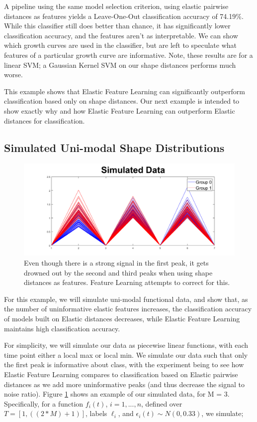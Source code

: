 \documentclass[]{article}
\begin{document}
A pipeline using the same model selection criterion, using elastic pairwise distances as features yields a Leave-One-Out classification accuracy of 74.19\%. While this classifier still does better than chance, it has significantly lower classification accuracy, and the features aren't as interpretable. We can show which growth curves are used in the classifier, but are left to speculate what features of a particular growth curve are informative. Note, these results are for a linear SVM; a Gaussian Kernel SVM on our shape distances performs much worse. 

This example shows that Elastic Feature Learning can significantly outperform classification based only on shape distances. Our next example is intended to show exactly why and how Elastic Feature Learning can outperform Elastic distances for classification.  


\subsection{Simulated Uni-modal Shape Distributions}

\begin{figure}
	\includegraphics[width = \linewidth]{./simulated data2.png}
	\caption{Even though there is a strong signal in the first peak, it gets drowned out by the second and third peaks when using shape distances as features. Feature Learning attempts to correct for this. }
	\label{simulated data}
\end{figure}

For this example, we will simulate uni-modal functional data, and show that, as the number of uninformative elastic features increases, the classification accuracy of models built on Elastic distances decreases, while Elastic Feature Learning maintains high classification accuracy.  

For simplicity, we will simulate our data as piecewise linear functions, with each time point either a local max or local min. We simulate our data such that only the first peak is informative about class, with the experiment being to see how Elastic Feature Learning compares to classification based on Elastic pairwise distances as we add more uninformative peaks (and thus decrease the signal to noise ratio). Figure \ref{simulated data} shows an example of our simulated data, for M = 3. Specifically, for a function $f_i(t)$, $i = 1,...,n$,  defined over $T=[1,((2*M)+1)]$, labels $\ell_i$, and $\epsilon_i(t) \sim N(0,0.33)$, we simulate;
\end{document}
